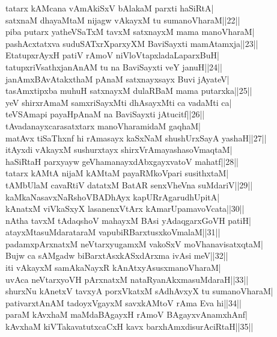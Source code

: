 \documentclass{article}
\begin{document}
tatarx kAMcana vAmAkiSxV bAlakaM parxti haSiRtA|\\
satxnaM dhayaMtaM nijagw vAkayxM tu sumanoVharaM||22||\\
piba putarx yatheVSaTxM tavxM satxnayxM mama manoVharaM|\\
pashAcxtatxva suduSATxrXparxyXM BaviSayxti mamAtamxja||23||\\
EtatupxrAyxH patiV rAmoV niVloVtapxladaLaparxBuH|\\
tatupxriVsathxjanAnAM tu na BaviSayxti veY januH||24||\\
janAmxBAvAtakxthaM pAnaM satxnayxsayx Buvi jAyateV|\\
tasAmxtipxba muhuH satxnayxM dulaRBaM mama putarxka||25||\\
yeV shirxrAmaM samxriSayxMti dhAsayxMti ca vadaMti ca|\\
teVSAmapi payaHpAnaM na BaviSayxti jAtucitf||26||\\
tAvadanayxcarasatxtarx manoVharamidaM gaqhaM|\\
matAvx tiSaThxnf hi rAmasayx kaSxNaM shushUrxSayA yashaH||27||\\
itAyxdi vAkayxM sushurxtayx shirxVrAmayashasoVmaqtaM|\\
haSiRtaH parxyayw geVhamanayxdAbxgayxvatoV mahatf||28||\\
tatarx kAMtA nijaM kAMtaM payaRMkoVpari susithxtaM|\\
tAMbUlaM cavaRtiV datatxM BatAR senxVheVna suMdariV||29||\\
kaMkaNasavxNaRshoVBADhAyx kapURrAgarudhUpitA|\\
kAnatxM viVkaSxyX lasanenxVtArx kAmarUpamavoVcata||30||\\
nAtha tavxM tAdaqshoV mahayxM BAsi yAdaqgarxGoVH patiH|\\
atayxMtasuMdarataraM vapubiRBarxtusxkoVmalaM||31||\\
padamxpArxnatxM neVtarxyugamxM vakoSxV moVhanavisatxqtaM|\\
Bujw ca sAMgadw biBarxtAsxkASxdArxma ivAsi meV||32||\\
iti vAkayxM samAkaNayxR kAnAtxyAsusxmanoVharaM|\\
uvAca neVtarxyoVH pArxnatxM nataRyanAkxmasuMdaraH||33||\\
shurxNu kAnetxV tavxyA porxVkatxM sAdhAvxyX tu sumanoVharaM|\\
pativarxtAnAM tadoyxVgayxM savxkAMtoV rAma Eva hi||34||\\
paraM kAvxhaM maMdaBAgayxH rAmoV BAgayxvAnamxhAnf|\\
kAvxhaM kiVTakavatutxcaCxH kavx barxhAmxdisurAciRtaH||35||\\
\end{document}
